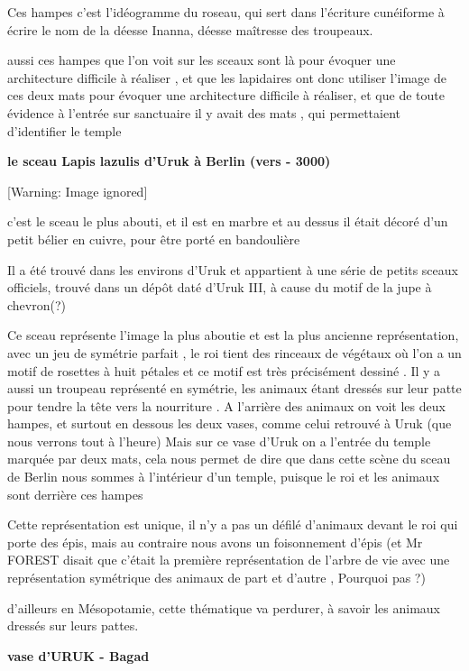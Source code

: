\documentclass[a4paper,10pt]{article}
\begin{document}
\begin{itemize}
Ces hampes c'est l'idéogramme du
roseau, qui sert dans l'écriture cunéiforme à écrire
le nom de la déesse Inanna, déesse maîtresse des troupeaux.

aussi ces hampes que l'on voit sur les sceaux sont là
pour évoquer une architecture difficile à réaliser , et que les
lapidaires ont donc utiliser l'image de ces deux mats
pour évoquer une architecture difficile à réaliser, et que de toute
évidence à l'entrée sur sanctuaire il y avait des mats
, qui permettaient d'identifier le temple

\textbf{le sceau Lapis lazulis d'Uruk à Berlin (vers -
3000)}

  [Warning: Image ignored] %
 

c'est le sceau le plus abouti, et il est en marbre et
au dessus il était décoré d'un petit bélier en cuivre,
pour être porté en bandoulière

Il a été trouvé dans les environs d'Uruk et appartient
à une série de petits sceaux officiels, trouvé dans un dépôt daté
d'Uruk III, à cause du motif de la jupe à chevron(?)

Ce sceau représente l'image la plus aboutie et est la
plus ancienne représentation, avec un jeu de symétrie parfait , le roi
tient des rinceaux de végétaux où l'on a un motif de
rosettes à huit pétales et ce motif est très précisément dessiné . Il y
a aussi un troupeau représenté en symétrie, les animaux étant dressés
sur leur patte pour tendre la tête vers la nourriture . A
l'arrière des animaux on voit les deux hampes, et
surtout en dessous les deux vases, comme celui retrouvé à Uruk (que
nous verrons tout à l'heure) Mais sur ce vase
d'Uruk on a l'entrée du temple
marquée par deux mats, cela nous permet de dire que dans cette scène du
sceau de Berlin nous sommes à l'intérieur
d'un temple, puisque le roi et les animaux sont
derrière ces hampes

Cette représentation est unique, il n'y a pas un défilé
d'animaux devant le roi qui porte des épis,  mais au
contraire nous avons un foisonnement d'épis (et Mr
FOREST disait que c'était la première représentation
de l'arbre de vie avec une représentation symétrique
des animaux de part et d'autre , Pourquoi pas ?)

d'ailleurs en Mésopotamie, cette thématique va
perdurer,  à savoir les animaux dressés sur leurs pattes.

\textbf{vase d'URUK - Bagad\ \ }


\end{itemize}
\end{document}
